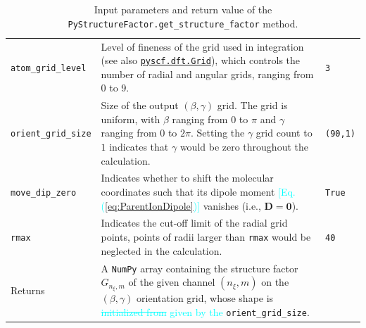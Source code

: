 \documentclass[preprint,12pt]{elsarticle} %
\newcommand{\bn}[1]{\mathbf{#1}}    %
\newcommand{\cyan}[1]{\textcolor{cyan}{#1}}     %
\newcommand{\cout}[1]{\textcolor{cyan}{\sout{#1}}}
\begin{document}
\begin{table}[tb]
\begin{tabular}{l p{9cm} l}
        \texttt{atom\_grid\_level}  & Level of fineness of the grid used in integration
                                      (see also \href{https://pyscf.org/pyscf_api_docs/pyscf.dft.html#module-pyscf.dft.gen_grid}{\texttt{pyscf.dft.Grid}}),
                                      which controls the number of radial and angular grids, ranging from 0 to 9.
                                                                                                                                                & \texttt{3}        \\
        \texttt{orient\_grid\_size} & Size of the output $(\beta,\gamma)$ grid.
                                      The grid is uniform, with $\beta$ ranging from $0$ to $\pi$ and $\gamma$ ranging from $0$ to $2\pi$.
                                      Setting the $\gamma$ grid count to $1$ indicates that $\gamma$ would be zero throughout the calculation.
                                                                                                                                                & \texttt{(90,1)}   \\
        \texttt{move\_dip\_zero}    & Indicates whether to shift the molecular coordinates such that its dipole moment \cyan{[Eq. (\ref{eq:ParentIonDipole})]} vanishes
                                      (i.e., $\bn{D}=\bn{0}$).
                                                                                                                                                & \texttt{True}     \\
        \texttt{rmax}               & Indicates the cut-off limit of the radial grid points,
                                      points of radii larger than \texttt{rmax} would be neglected in the calculation.
                                                                                                                                                & \texttt{40}       \\
        \hline
        Returns                     & A \texttt{NumPy} array containing the structure factor $G_{n_\xi,m}$ of the given channel $(n_\xi,m)$
                                      on the $(\beta,\gamma)$ orientation grid, whose shape is \cout{initialized from} \cyan{given by the} \texttt{orient\_grid\_size}. \\
        \hline \hline
    \end{tabular}
    \caption{Input parameters and return value of the \texttt{PyStructureFactor.get\_structure\_factor} method.}
    \label{tab:getsf_param}
\end{table}
\end{document}
